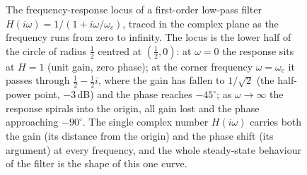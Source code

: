 \begin{figure}[htbp]
\centering
{}
\caption[Low-pass frequency-response locus]{The frequency-response locus of a
first-order low-pass filter $H(i\omega) = 1/(1 + i\omega/\omega_c)$, traced in
the complex plane as the frequency runs from zero to infinity. The locus is the
lower half of the circle of radius $\tfrac{1}{2}$ centred at $(\tfrac{1}{2},
0)$: at $\omega = 0$ the response sits at $H = 1$ (unit gain, zero phase); at
the corner frequency $\omega = \omega_c$ it passes through $\tfrac{1}{2} -
\tfrac{1}{2}i$, where the gain has fallen to $1/\sqrt 2$ (the half-power point,
$-3\,$dB) and the phase reaches $-45^{\circ}$; as $\omega \to \infty$ the
response spirals into the origin, all gain lost and the phase approaching
$-90^{\circ}$. The single complex number $H(i\omega)$ carries both the gain
(its distance from the origin) and the phase shift (its argument) at every
frequency, and the whole steady-state behaviour of the filter is the shape of
this one curve.}
\label{fig:vol02ch03:lowpass-locus}
\end{figure}
